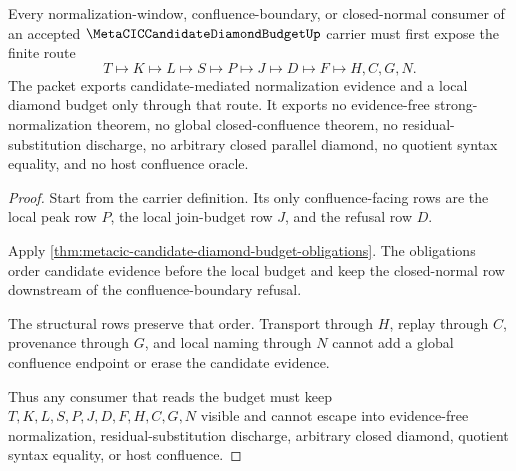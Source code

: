 \begin{theorem}
\label{thm:metacic-candidate-diamond-budget-nonescape}
Every normalization-window, confluence-boundary, or closed-normal consumer of an accepted $\MetaCICCandidateDiamondBudgetUp$ carrier must first expose the finite route
$$
T\longmapsto K\longmapsto L\longmapsto S\longmapsto P\longmapsto J\longmapsto D\longmapsto F\longmapsto H,C,G,N .
$$
The packet exports candidate-mediated normalization evidence and a local diamond budget only through that route. It exports no evidence-free strong-normalization theorem, no global closed-confluence theorem, no residual-substitution discharge, no arbitrary closed parallel diamond, no quotient syntax equality, and no host confluence oracle.
\end{theorem}
\begin{proof}
Start from the carrier definition. Its only confluence-facing rows are the local peak row $P$, the local join-budget row $J$, and the refusal row $D$.

Apply \autoref{thm:metacic-candidate-diamond-budget-obligations}. The obligations order candidate evidence before the local budget and keep the closed-normal row downstream of the confluence-boundary refusal.

The structural rows preserve that order. Transport through $H$, replay through $C$, provenance through $G$, and local naming through $N$ cannot add a global confluence endpoint or erase the candidate evidence.

Thus any consumer that reads the budget must keep $T,K,L,S,P,J,D,F,H,C,G,N$ visible and cannot escape into evidence-free normalization, residual-substitution discharge, arbitrary closed diamond, quotient syntax equality, or host confluence.
\end{proof}


